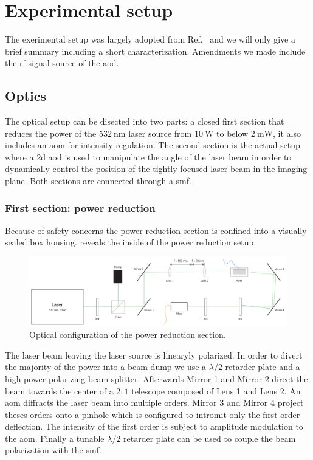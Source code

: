 \chapter{Experimental setup}\label{ch:experimental_setup}

The exerimental setup was largely adopted from Ref.~\cite{Hertlein2017} and we
will only give a brief summary including a short characterization. Amendments
we made include the \gls{rf} signal source of the \gls{aod}.

\section{Optics}

The optical setup can be disected into two parts: a closed first section that
reduces the power of the $\SI{532}{\nano\meter}$ laser source from
$\SI{10}{\watt}$ to below $\SI{2}{\milli\watt}$, it also includes an \gls{aom}
for intensity regulation. The second section is the actual setup where a
\gls{2d} \gls{aod} is used to manipulate the angle of the laser beam in order
to dynamically control the position of the tightly-focused laser beam in the
imaging plane. Both sections are connected through a \gls{smf}.

\subsection{First section: power reduction}\label{subsec:setup_power_reduction}

Because of safety concerns the power reduction section is confined into a
visually sealed box housing.  reveals the
inside of the power reduction setup.
\begin{figure}[htb]
  \centering
  \includegraphics[width=\textwidth]{../figure/setup/power-reduction.pdf}
  \caption{Optical configuration of the power reduction section.
  }\label{fig:setup_power_reduction}
\end{figure}
The laser beam leaving the laser source is linearyly polarized. In order to
divert the majority of the power into a beam dump we use a $\lambda/2$
retarder plate and a high-power polarizing beam splitter. Afterwards Mirror
\num{1} and Mirror \num{2} direct
the beam towards the center of a $2:1$ telescope composed of Lens 1 and
Lens 2. An \gls{aom} diffracts the laser beam into multiple orders. Mirror 3
and Mirror 4 project theses orders onto a pinhole which is configured to
intromit only the first order deflection. The intensity of the first order is
subject to amplitude modulation to the \gls{aom}. Finally a tunable
$\lambda/2$ retarder plate can be used to couple the beam polarization with
the \gls{smf}.

